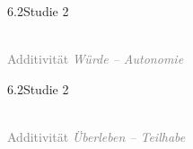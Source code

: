 \documentclass[xcolor=table,9pt,aspectratio=169]{beamer}
\begin{document}
\begin{frame}{\vspace*{10mm}6.2\hspace*{1em}Studie 2}
\begin{center}
   \\
   \footnotesize{\textcolor{gray}{Additivität \textit{Würde -- Autonomie}}}
\end{center}
\end{frame}


\begin{frame}{\vspace*{10mm}6.2\hspace*{1em}Studie 2}
\begin{center}
   \\
   \footnotesize{\textcolor{gray}{Additivität \textit{Überleben -- Teilhabe}}}
\end{center}
\end{frame}
\end{document}

